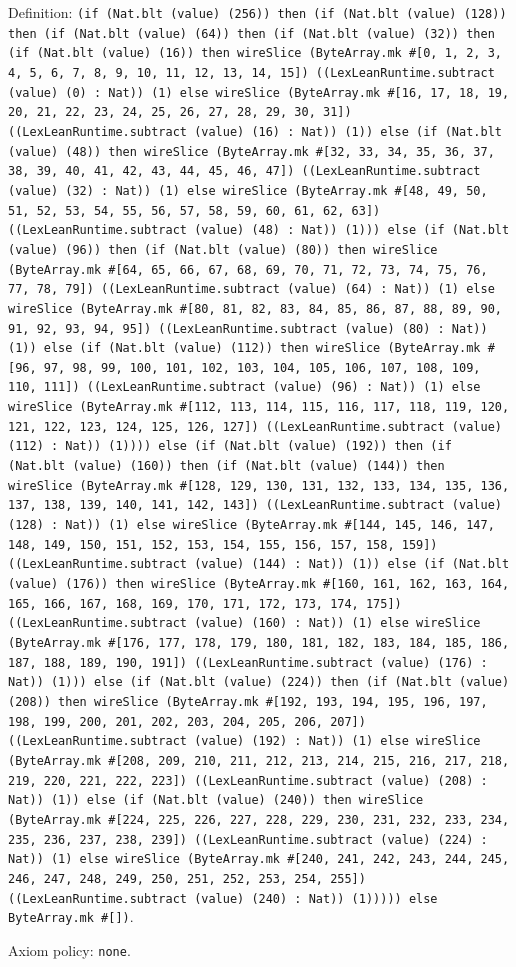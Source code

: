 \documentclass[11pt]{article}
\begin{document}
\noindent Definition: \texttt{(if (Nat.blt (value) (256)) then (if (Nat.blt (value) (128)) then (if (Nat.blt (value) (64)) then (if (Nat.blt (value) (32)) then (if (Nat.blt (value) (16)) then wireSlice (ByteArray.mk \#[0, 1, 2, 3, 4, 5, 6, 7, 8, 9, 10, 11, 12, 13, 14, 15]) ((LexLeanRuntime.subtract (value) (0) : Nat)) (1) else wireSlice (ByteArray.mk \#[16, 17, 18, 19, 20, 21, 22, 23, 24, 25, 26, 27, 28, 29, 30, 31]) ((LexLeanRuntime.subtract (value) (16) : Nat)) (1)) else (if (Nat.blt (value) (48)) then wireSlice (ByteArray.mk \#[32, 33, 34, 35, 36, 37, 38, 39, 40, 41, 42, 43, 44, 45, 46, 47]) ((LexLeanRuntime.subtract (value) (32) : Nat)) (1) else wireSlice (ByteArray.mk \#[48, 49, 50, 51, 52, 53, 54, 55, 56, 57, 58, 59, 60, 61, 62, 63]) ((LexLeanRuntime.subtract (value) (48) : Nat)) (1))) else (if (Nat.blt (value) (96)) then (if (Nat.blt (value) (80)) then wireSlice (ByteArray.mk \#[64, 65, 66, 67, 68, 69, 70, 71, 72, 73, 74, 75, 76, 77, 78, 79]) ((LexLeanRuntime.subtract (value) (64) : Nat)) (1) else wireSlice (ByteArray.mk \#[80, 81, 82, 83, 84, 85, 86, 87, 88, 89, 90, 91, 92, 93, 94, 95]) ((LexLeanRuntime.subtract (value) (80) : Nat)) (1)) else (if (Nat.blt (value) (112)) then wireSlice (ByteArray.mk \#[96, 97, 98, 99, 100, 101, 102, 103, 104, 105, 106, 107, 108, 109, 110, 111]) ((LexLeanRuntime.subtract (value) (96) : Nat)) (1) else wireSlice (ByteArray.mk \#[112, 113, 114, 115, 116, 117, 118, 119, 120, 121, 122, 123, 124, 125, 126, 127]) ((LexLeanRuntime.subtract (value) (112) : Nat)) (1)))) else (if (Nat.blt (value) (192)) then (if (Nat.blt (value) (160)) then (if (Nat.blt (value) (144)) then wireSlice (ByteArray.mk \#[128, 129, 130, 131, 132, 133, 134, 135, 136, 137, 138, 139, 140, 141, 142, 143]) ((LexLeanRuntime.subtract (value) (128) : Nat)) (1) else wireSlice (ByteArray.mk \#[144, 145, 146, 147, 148, 149, 150, 151, 152, 153, 154, 155, 156, 157, 158, 159]) ((LexLeanRuntime.subtract (value) (144) : Nat)) (1)) else (if (Nat.blt (value) (176)) then wireSlice (ByteArray.mk \#[160, 161, 162, 163, 164, 165, 166, 167, 168, 169, 170, 171, 172, 173, 174, 175]) ((LexLeanRuntime.subtract (value) (160) : Nat)) (1) else wireSlice (ByteArray.mk \#[176, 177, 178, 179, 180, 181, 182, 183, 184, 185, 186, 187, 188, 189, 190, 191]) ((LexLeanRuntime.subtract (value) (176) : Nat)) (1))) else (if (Nat.blt (value) (224)) then (if (Nat.blt (value) (208)) then wireSlice (ByteArray.mk \#[192, 193, 194, 195, 196, 197, 198, 199, 200, 201, 202, 203, 204, 205, 206, 207]) ((LexLeanRuntime.subtract (value) (192) : Nat)) (1) else wireSlice (ByteArray.mk \#[208, 209, 210, 211, 212, 213, 214, 215, 216, 217, 218, 219, 220, 221, 222, 223]) ((LexLeanRuntime.subtract (value) (208) : Nat)) (1)) else (if (Nat.blt (value) (240)) then wireSlice (ByteArray.mk \#[224, 225, 226, 227, 228, 229, 230, 231, 232, 233, 234, 235, 236, 237, 238, 239]) ((LexLeanRuntime.subtract (value) (224) : Nat)) (1) else wireSlice (ByteArray.mk \#[240, 241, 242, 243, 244, 245, 246, 247, 248, 249, 250, 251, 252, 253, 254, 255]) ((LexLeanRuntime.subtract (value) (240) : Nat)) (1))))) else ByteArray.mk \#[])}.\par
\noindent Axiom policy: \texttt{none}.\par
\end{document}
